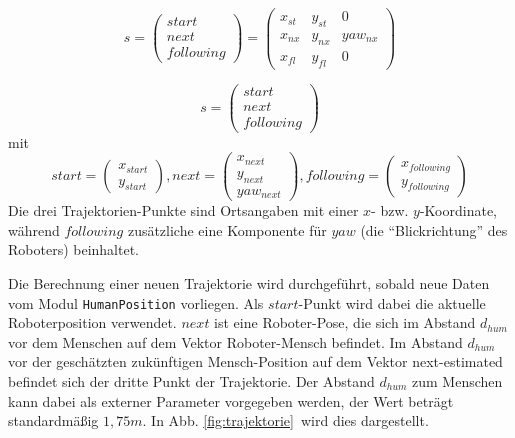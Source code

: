 \begin{equation}
	s =
	\begin{pmatrix} start \\ next \\ following \end{pmatrix} =
	\begin{pmatrix} x_{st} & y_{st} & 0 \\ x_{nx} & y_{nx} & yaw_{nx} \\ x_{fl} & y_{fl} & 0 \end{pmatrix}
\end{equation}


\begin{equation}
	s =	\begin{pmatrix} start \\ next \\ following \end{pmatrix}
\end{equation}
mit 
\begin{equation}
	start = 		\begin{pmatrix}	x_{start} \\ y_{start}							\end{pmatrix},
	next = 			\begin{pmatrix} x_{next} \\ y_{next} \\ yaw_{next}	\end{pmatrix},
	following =	\begin{pmatrix}	x_{following} \\ y_{following}							\end{pmatrix}
\end{equation}
Die drei Trajektorien-Punkte sind Ortsangaben mit einer $x$- bzw. $y$-Koordinate, während $following$ zusätzliche eine Komponente für $yaw$ (die ``Blickrichtung'' des Roboters) beinhaltet.

Die Berechnung einer neuen Trajektorie wird durchgeführt, sobald neue Daten vom Modul \lstinline{HumanPosition} vorliegen.
Als $start$-Punkt wird dabei die aktuelle Roboterposition verwendet.
$next$ ist eine Roboter-Pose, die sich im Abstand $d_{hum}$ vor dem Menschen auf dem Vektor Roboter-Mensch befindet.
Im Abstand $d_{hum}$ vor der geschätzten zukünftigen Mensch-Position auf dem Vektor next-estimated befindet sich der dritte Punkt der Trajektorie.
Der Abstand $d_{hum}$ zum Menschen kann dabei als externer Parameter vorgegeben werden, der Wert beträgt standardmäßig $1,75m$.
In Abb. \ref{fig:trajektorie}\ wird dies dargestellt.

